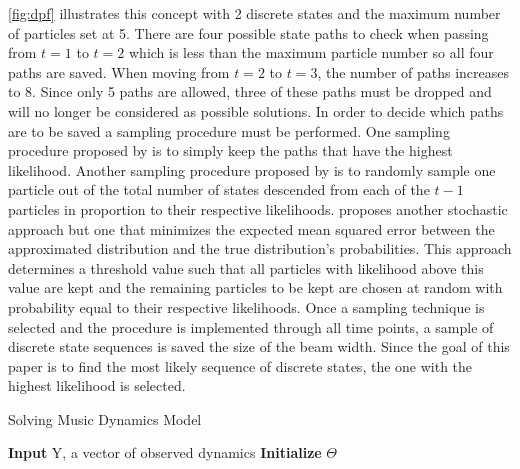 \documentclass[12pt]{article}
\begin{document}
\autoref{fig:dpf} illustrates this concept with 2 discrete states and
the maximum number of particles set at 5. There are four possible state
paths to check when passing from \(t=1\) to \(t=2\) which is less than
the maximum particle number so all four paths are saved. When moving
from \(t=2\) to \(t=3\), the number of paths increases to 8. Since only
5 paths are allowed, three of these paths must be dropped and will no
longer be considered as possible solutions. In order to decide which
paths are to be saved a sampling procedure must be performed. One
sampling procedure proposed by \citep{tugnait_detection_1982} is to
simply keep the paths that have the highest likelihood. Another sampling
procedure proposed by \citep{akashi_random_1977} is to randomly sample
one particle out of the total number of states descended from each of
the \(t-1\) particles in proportion to their respective likelihoods.
\citep{fearnhead_-line_2003} proposes another stochastic approach but
one that minimizes the expected mean squared error between the
approximated distribution and the true distribution's probabilities.
This approach determines a threshold value such that all particles with
likelihood above this value are kept and the remaining particles to be
kept are chosen at random with probability equal to their respective
likelihoods. Once a sampling technique is selected and the procedure is
implemented through all time points, a sample of discrete state
sequences is saved the size of the beam width. Since the goal of this
paper is to find the most likely sequence of discrete states, the one
with the highest likelihood is selected.

\begin{algorithm}[t]
 \caption{Solving Music Dynamics Model\label{alg:masteralgorithm}}
\SetAlgoLined
 \textbf{Input} Y, a vector of observed dynamics\;
 \textbf{Initialize} $\Theta$\;
\end{algorithm}
\end{document}
